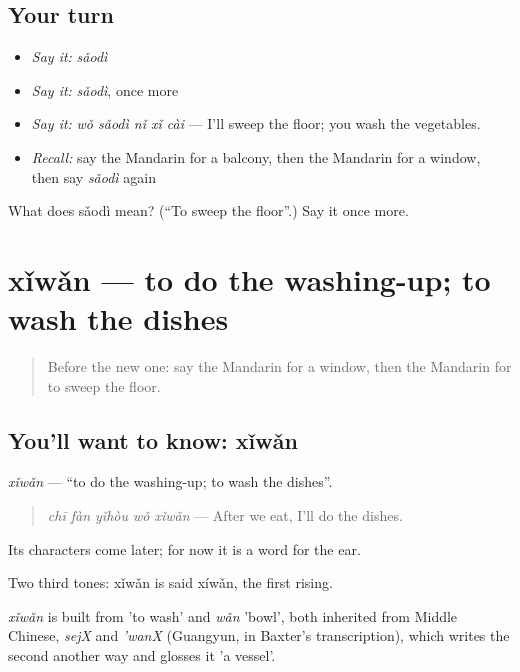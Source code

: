 \subsection*{Your turn}
\begin{itemize}
\raggedright
  \item \emph{Say it:} \emph{sǎodì}
  \item \emph{Say it:} \emph{sǎodì}, once more
  \item \emph{Say it:} \emph{wǒ sǎodì nǐ xǐ cài} — I'll sweep the floor; you wash the vegetables.
  \item \emph{Recall:} say the Mandarin for a balcony, then the Mandarin for a window, then say \emph{sǎodì} again
\end{itemize}

\begin{tcolorbox}[breakable,colback=teal!4,colframe=teal!35!black,title={Before you move on}]
What does sǎodì mean? (\textquotedblleft{}To sweep the floor\textquotedblright{}.) Say it once more.
\end{tcolorbox}
\section[xǐwǎn]{xǐwǎn — to do the washing-up; to wash the dishes}

\label{lesson:ZH-C160-xiwan}



\begin{quote}
Before the new one: say the Mandarin for a window, then the Mandarin for to sweep the floor.
\end{quote}

\subsection*{You'll want to know: xǐwǎn}
\emph{xǐwǎn} — \textquotedblleft{}to do the washing-up; to wash the dishes\textquotedblright{}.

\begin{quote}
\emph{chī fàn yǐhòu wǒ xǐwǎn} — After we eat, I'll do the dishes.
\end{quote}

Its characters come later; for now it is a word for the ear.

Two third tones: xǐwǎn is said xíwǎn, the first rising.

\begin{cousinweb}
\emph{xǐwǎn} is built from  'to wash' and \emph{wǎn} 'bowl', both inherited from Middle Chinese, \emph{sejX} and \emph{'wanX} (Guangyun, in Baxter's transcription), which writes the second another way and glosses it 'a vessel'.
\end{cousinweb}

